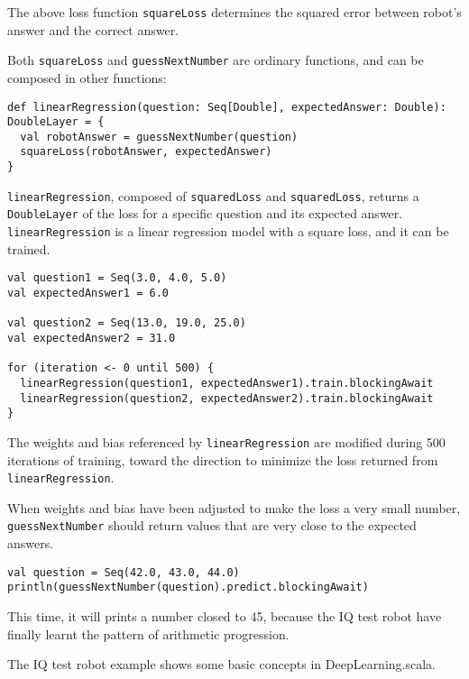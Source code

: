 The above loss function \lstinline{squareLoss} determines the squared error between robot's answer and the correct answer.

Both \lstinline{squareLoss} and \lstinline{guessNextNumber} are ordinary functions, and can be composed in other functions:

\begin{lstlisting}[caption={A differentiable function to train a linear regression model}]
def linearRegression(question: Seq[Double], expectedAnswer: Double): DoubleLayer = {
  val robotAnswer = guessNextNumber(question)
  squareLoss(robotAnswer, expectedAnswer)
}
\end{lstlisting}

\lstinline{linearRegression}, composed of \lstinline{squaredLoss} and \lstinline{squaredLoss}, returns a \lstinline{DoubleLayer} of the loss for a specific question and its expected answer. \lstinline{linearRegression} is a linear regression model with a square loss, and it can be trained.

\begin{lstlisting}[caption={Training for 500 iterations}]
val question1 = Seq(3.0, 4.0, 5.0)
val expectedAnswer1 = 6.0

val question2 = Seq(13.0, 19.0, 25.0)
val expectedAnswer2 = 31.0

for (iteration <- 0 until 500) {
  linearRegression(question1, expectedAnswer1).train.blockingAwait
  linearRegression(question2, expectedAnswer2).train.blockingAwait
}
\end{lstlisting}

The weights and bias referenced by \lstinline{linearRegression} are modified during 500 iterations of training, toward the direction to minimize the loss returned from \lstinline{linearRegression}.

When weights and bias have been adjusted to make the loss a very small number, \lstinline{guessNextNumber} should return values that are very close to the expected answers.

\begin{lstlisting}[caption={Inference on a trained model},label={predict_trained}]
val question = Seq(42.0, 43.0, 44.0)
println(guessNextNumber(question).predict.blockingAwait)
\end{lstlisting}

This time, it will prints a number closed to 45, because the IQ test robot have finally learnt the pattern of arithmetic progression.

The IQ test robot example shows some basic concepts in DeepLearning.scala.

